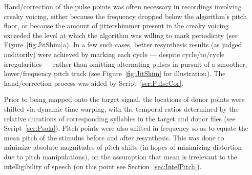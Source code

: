 Hand\-/correction of the pulse points was often necessary in recordings involving creaky voicing, either because the frequency dropped below the algorithm’s pitch floor, or because the amount of jitter\slsh shimmer present in the creaky voicing exceeded the level at which the algorithm was willing to mark periodicity (see Figure~\ref{fig:JitShim}a).  In a few such cases, better resynthesis results (as judged auditorily) were achieved by marking each cycle — despite cycle\-/to\-/cycle irregularities — rather than omitting alternating pulses in pursuit of a smoother, lower\-/frequency pitch track (see Figure~\ref{fig:JitShim} for illustration).  The hand\-/correction process was aided by Script~\ref{scr:PulseCor}.%

Prior to being mapped onto the target signal, the locations of donor \fo{} points were shifted via dynamic time warping, with the temporal ratios determined by the relative durations of corresponding syllables in the target and donor files (see Script~\ref{scr:Psola}).  Pitch points were also shifted in frequency so as to equate the mean pitch of the stimulus before and after resynthesis.  This was done to minimize absolute magnitudes of pitch shifts (in hopes of minimizing distortion due to pitch manipulations), on the assumption that mean \fo{} is irrelevant to the intelligibility of speech (on this point see Section~\ref{sec:IntelPitch}).

